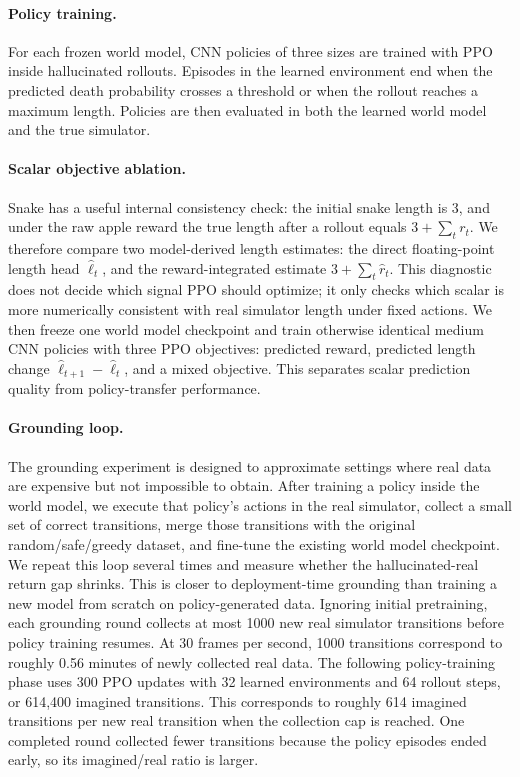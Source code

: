 \documentclass[11pt]{article}
\begin{document}
\paragraph{Policy training.}
For each frozen world model, CNN policies of three sizes are trained with PPO~\cite{schulman2017ppo} inside hallucinated rollouts.
Episodes in the learned environment end when the predicted death probability crosses a threshold or when the rollout reaches a maximum length.
Policies are then evaluated in both the learned world model and the true simulator.

\paragraph{Scalar objective ablation.}
Snake has a useful internal consistency check: the initial snake length is 3, and under the raw apple reward the true length after a rollout equals $3 + \sum_t r_t$.
We therefore compare two model-derived length estimates: the direct floating-point length head $\hat{\ell}_t$, and the reward-integrated estimate $3 + \sum_t \hat{r}_t$.
This diagnostic does not decide which signal PPO should optimize; it only checks which scalar is more numerically consistent with real simulator length under fixed actions.
We then freeze one world model checkpoint and train otherwise identical medium CNN policies with three PPO objectives: predicted reward, predicted length change $\hat{\ell}_{t+1}-\hat{\ell}_t$, and a mixed objective.
This separates scalar prediction quality from policy-transfer performance.

\paragraph{Grounding loop.}
The grounding experiment is designed to approximate settings where real data are expensive but not impossible to obtain.
After training a policy inside the world model, we execute that policy's actions in the real simulator, collect a small set of correct transitions, merge those transitions with the original random/safe/greedy dataset, and fine-tune the existing world model checkpoint.
We repeat this loop several times and measure whether the hallucinated-real return gap shrinks.
This is closer to deployment-time grounding than training a new model from scratch on policy-generated data.
Ignoring initial pretraining, each grounding round collects at most 1000 new real simulator transitions before policy training resumes.
At 30 frames per second, 1000 transitions correspond to roughly 0.56 minutes of newly collected real data.
The following policy-training phase uses 300 PPO updates with 32 learned environments and 64 rollout steps, or 614{,}400 imagined transitions.
This corresponds to roughly 614 imagined transitions per new real transition when the collection cap is reached.
One completed round collected fewer transitions because the policy episodes ended early, so its imagined/real ratio is larger.
\end{document}
